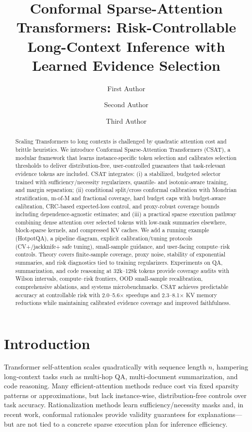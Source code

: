 \documentclass[11pt]{article}
\title{Conformal Sparse-Attention Transformers: Risk-Controllable Long-Context Inference with Learned Evidence Selection}
\author[1]{First Author}
\author[1]{Second Author}
\author[2]{Third Author}
\affil[1]{Department of Computer Science, University A}
\affil[2]{Research Lab B}
\date{}
\begin{document}
\maketitle

\begin{abstract}
Scaling Transformers to long contexts is challenged by quadratic attention cost and brittle heuristics. We introduce Conformal Sparse-Attention Transformers (CSAT), a modular framework that learns instance-specific token selection and calibrates selection thresholds to deliver distribution-free, user-controlled guarantees that task-relevant evidence tokens are included. CSAT integrates: (i) a stabilized, budgeted selector trained with sufficiency/necessity regularizers, quantile- and isotonic-aware training, and margin separation; (ii) conditional split/cross conformal calibration with Mondrian stratification, m-of-M and fractional coverage, hard budget caps with budget-aware calibration, CRC-based expected-loss control, and proxy-robust coverage bounds including dependence-agnostic estimates; and (iii) a practical sparse execution pathway combining dense attention over selected tokens with low-rank summaries elsewhere, block-sparse kernels, and compressed KV caches. We add a running example (HotpotQA), a pipeline diagram, explicit calibration/tuning protocols (CV+/jackknife+ safe tuning), small-sample guidance, and user-facing compute--risk controls. Theory covers finite-sample coverage, proxy noise, stability of exponential summaries, and risk diagnostics tied to training regularizers. Experiments on QA, summarization, and code reasoning at 32k--128k tokens provide coverage audits with Wilson intervals, compute--risk frontiers, OOD small-sample recalibration, comprehensive ablations, and systems microbenchmarks. CSAT achieves predictable accuracy at controllable risk with 2.0--5.6$\times$ speedups and 2.3--8.1$\times$ KV memory reductions while maintaining calibrated evidence coverage and improved faithfulness.
\end{abstract}

\section{Introduction}
Transformer self-attention scales quadratically with sequence length $n$, hampering long-context tasks such as multi-hop QA, multi-document summarization, and code reasoning. Many efficient-attention methods reduce cost via fixed sparsity patterns or approximations, but lack instance-wise, distribution-free controls over task accuracy. Rationalization methods learn sufficiency/necessity masks and, in recent work, conformal rationales provide validity guarantees for explanations---but are not tied to a concrete sparse execution plan for inference efficiency.
\end{document}
